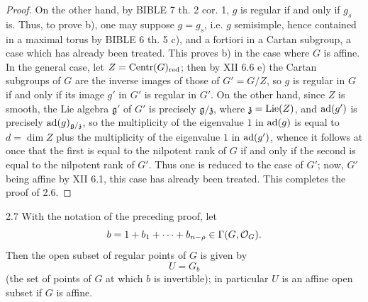 \begin{proof}
On the other hand, by BIBLE 7 th. 2 cor. 1, $g$ is regular if and only
if $g_s$ is. Thus, to prove b), one may suppose $g=g_s$, i.e. $g$
semisimple, hence contained in a maximal torus by BIBLE 6 th. 5 c),
and a fortiori in a Cartan subgroup, a case which has already been
treated. This proves b) in the case where $G$ is affine. In the general
case, let $Z=\operatorname{Centr}(G)_{\mathrm{red}}$; then by XII 6.6 e) the Cartan
subgroups of $G$ are the inverse images of those of $G'=G/Z$, so $g$
is regular in $G$ if and only if its image $g'$ in $G'$ is regular in
$G'$. On the other hand, since $Z$ is smooth, the Lie algebra
$\mathfrak g'$ of $G'$ is precisely $\mathfrak g/\mathfrak z$, where
$\mathfrak z=\operatorname{Lie}(Z)$, and $\operatorname{ad}(g')$ is precisely
$\operatorname{ad}(g)_{\mathfrak g/\mathfrak z}$, so the multiplicity of the eigenvalue
$1$ in $\operatorname{ad}(g)$ is equal to $d=\dim Z$ plus the multiplicity of the
eigenvalue $1$ in $\operatorname{ad}(g')$, whence it follows at once that the first
is equal to the nilpotent rank of $G$ if and only if the second is
equal to the nilpotent rank of $G'$. Thus one is reduced to the case
of $G'$; now, $G'$ being affine by XII 6.1, this case has already been
treated. This completes the proof of 2.6.
\end{proof}

\begin{corollary}{2.7}\label{XIII.2.7}
With the notation of the preceding proof, let
\[
 b=1+b_1+\cdots+b_{n-\rho}\in\Gamma(G,\mathcal{O}_G).
\]
Then the open subset of regular points of $G$ is given by
\[
 U=G_b
\]
(the set of points of $G$ at which $b$ is invertible); in particular $U$
is an affine open subset if $G$ is affine.
\end{corollary}

